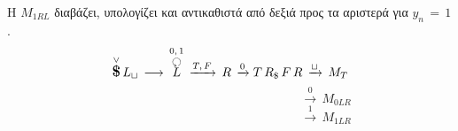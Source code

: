 \par Η $M_{1RL}$ διαβάζει, υπολογίζει και αντικαθιστά από δεξιά προς τα αριστερά για $y_n\,=\,1$.
\reducevspace\reducevspace\reducevspace\reducevspace\reducevspace\reducevspace\reducevspace\reducevspace\reducevspace
\reducevspace\reducevspace\reducevspace\reducevspace\reducevspace\reducevspace\reducevspace\reducevspace\reducevspace
\[\overset{\lor}{{\text{\large\bfseries \$}}}\,L_\sqcup\, \longrightarrow\,
\overset{0,\,1}{\overset{\botcircleleft}{L}}\, \xrightarrow{T,\,F}\,R\,\xrightarrow{0} T\, R_\$\, F\, R\,
\xrightarrow{\sqcup}\, M_T \]
\reducevspace\reducevspace\reducevspace\reducevspace\reducevspace\reducevspace\reducevspace
\reducevspace\reducevspace\reducevspace\reducevspace\reducevspace\reducevspace\reducevspace
\reducevspace\reducevspace\reducevspace\reducevspace\reducevspace\reducevspace\reducevspace
\reducevspace\reducevspace\reducevspace\reducevspace\reducevspace\reducevspace\reducevspace
\[\qquad\qquad\qquad\qquad\qquad\qquad\qquad\quad\;\, \xrightarrow{0}\, M_{0LR}\]
\reducevspace\reducevspace\reducevspace\reducevspace\reducevspace\reducevspace\reducevspace
\reducevspace\reducevspace\reducevspace\reducevspace\reducevspace\reducevspace\reducevspace
\reducevspace\reducevspace\reducevspace\reducevspace\reducevspace\reducevspace\reducevspace
\reducevspace\reducevspace\reducevspace\reducevspace\reducevspace\reducevspace\reducevspace
\[\qquad\qquad\qquad\qquad\qquad\qquad\qquad\quad\;\, \xrightarrow{1}\, M_{1LR}\]

